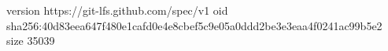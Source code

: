 version https://git-lfs.github.com/spec/v1
oid sha256:40d83eea647f480e1cafd0e4e8cbef5c9e05a0ddd2be3e3eaa4f0241ac99b5e2
size 35039
